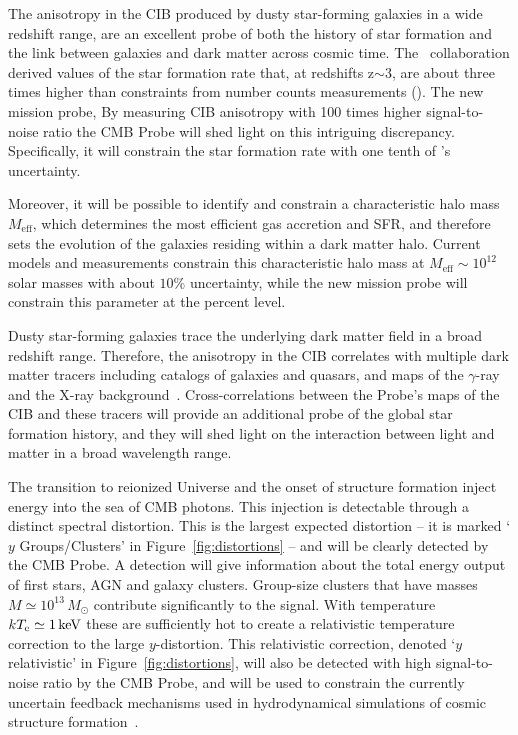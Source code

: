 The anisotropy in the \ac{CIB} produced by dusty star-forming galaxies in a wide redshift range, are
an excellent probe of both the history of star formation and the link between
galaxies and dark matter across cosmic time. The \planck\ collaboration 
derived values of the star formation rate that,
at redshifts z$\mathrm{\sim3}$, are about three times higher
than constraints from number counts measurements (\cite{planck2014-XXX,planckXVIII,madau2014}).
The new mission probe, 
By measuring \ac{CIB} anisotropy with 100 times higher signal-to-noise ratio
the CMB Probe will shed light on this intriguing discrepancy. 
Specifically, it will constrain the star formation rate with one tenth of \planck 's uncertainty. 

Moreover, it will be possible to identify and constrain a
characteristic halo mass $M_{\mathrm{eff}}$,
which determines the most efficient gas accretion and SFR, and
therefore sets the evolution of the galaxies residing within
a dark matter halo. Current models and measurements constrain this characteristic halo mass at
$M_{\mathrm{eff}}\sim 10^{12}$ solar masses with about $\mathrm{10\%}$ uncertainty, while the new 
mission probe will constrain this parameter at the percent level.

Dusty star-forming galaxies trace the underlying dark matter
field in a broad redshift range. Therefore, the anisotropy in the \ac{CIB} 
correlates with multiple dark matter tracers including catalogs of galaxies and quasars, 
and maps of the $\gamma$-ray and the X-ray background~\cite{serra2014,wang2015,cooray2016}.
Cross-correlations between the Probe's maps of the \ac{CIB} and these tracers will provide an 
additional probe of the global star formation history, and they will shed light on the interaction between 
light and matter in a broad wavelength range. 

The transition to reionized Universe and the onset of structure formation inject
energy into the sea of CMB photons. This injection is detectable through a distinct spectral distortion. 
This is the largest expected distortion -- it is marked `$y$ Groups/Clusters' in Figure~\ref{fig:distortions} --
and will be clearly detected by the CMB Probe. 
A detection will give information about the total energy output of first stars, AGN and galaxy clusters. 
Group-size clusters that have masses $M\simeq 10^{13}\,M_{\odot}$ contribute significantly to the signal. 
With temperature $k T_{\rm e}\simeq 1\,{\rm keV}$ these are sufficiently hot to create a relativistic 
temperature correction to the large $y$-distortion. This relativistic correction, denoted `$y$ relativistic' in 
Figure~\ref{fig:distortions},  will also be detected with high signal-to-noise ratio by the CMB Probe, and 
will be used to constrain the currently uncertain feedback mechanisms used in hydrodynamical simulations
of cosmic structure formation~\citep{Hill2015}. 

